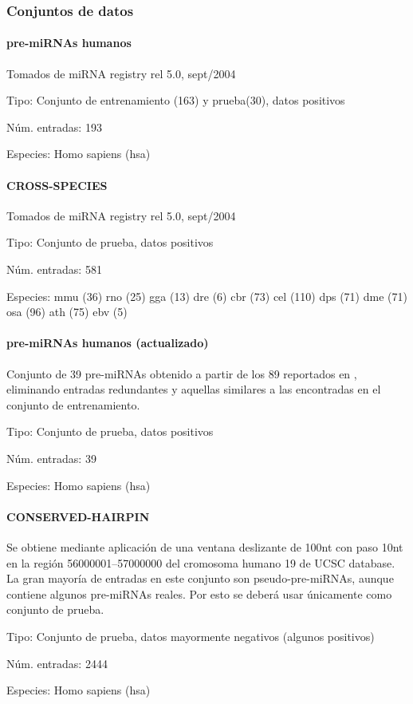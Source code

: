 \documentclass[12pt,bibliography=oldstyle,DIV=12,parskip=half-,titlepage]{scrartcl}
\begin{document}
\subsubsection{Conjuntos de datos}
\paragraph{pre-miRNAs humanos}
Tomados de miRNA registry rel 5.0, sept/2004
\begin{description*}
\item[Tipo:] Conjunto de entrenamiento (163) y prueba(30), datos
  positivos
\item[Núm. entradas:] 193
\item[Especies:] Homo sapiens (hsa)
\end{description*}
\paragraph{CROSS-SPECIES}
Tomados de miRNA registry rel 5.0, sept/2004
\begin{description*}
\item[Tipo:] Conjunto de prueba, datos positivos
\item[Núm. entradas:] 581
\item[Especies:]
  \quad mmu (36)
  \quad rno (25)
  \quad gga (13)
  \quad dre (6)
  \quad cbr (73)
  \quad cel (110)
  \quad dps (71)
  \quad dme (71)
  \quad osa (96)
  \quad ath (75)
  \quad ebv (5)
\end{description*}
%
\paragraph{pre-miRNAs humanos (actualizado)}
Conjunto de 39 pre-miRNAs obtenido a partir de los 89 reportados en
\cite{bentwich}, eliminando entradas redundantes y aquellas similares
a las encontradas en el conjunto de entrenamiento.
\begin{description*}
\item[Tipo:] Conjunto de prueba, datos positivos
\item[Núm. entradas:] 39
\item[Especies:]  Homo sapiens (hsa)
\end{description*}

\bigskip


\paragraph{CONSERVED-HAIRPIN}
Se obtiene mediante aplicación de una ventana deslizante de 100nt con
paso 10nt en la región 56000001--57000000 del cromosoma humano 19 de
UCSC database. La gran mayoría de entradas en este conjunto son
pseudo-pre-miRNAs, aunque contiene algunos pre-miRNAs reales.  Por
esto se deberá usar únicamente como conjunto de prueba.
\begin{description*}
\item[Tipo:] Conjunto de prueba, datos mayormente negativos (algunos
  positivos)
\item[Núm. entradas:] 2444
\item[Especies:]  Homo sapiens (hsa)
\end{description*}
\end{document}
